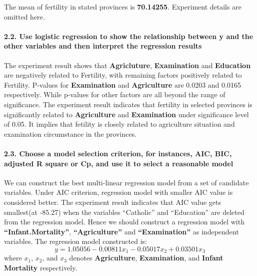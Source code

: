 \documentclass[]{article}
\let\oldparagraph\paragraph
\renewcommand{\paragraph}[1]{\oldparagraph{#1}\mbox{}}
\begin{document}
The mean of fertility in stated provinces is \textbf{70.14255}.
Experiment details are omitted here.

\hypertarget{use-logistic-regression-to-show-the-relationship-between-y-and-the-other-variables-and-then-interpret-the-regression-results}{%
\paragraph{\texorpdfstring{\textbf{2.2. Use logistic regression to show
the relationship between y and the other variables and then interpret
the regression
results}}{2.2. Use logistic regression to show the relationship between y and the other variables and then interpret the regression results}}\label{use-logistic-regression-to-show-the-relationship-between-y-and-the-other-variables-and-then-interpret-the-regression-results}}

The experiment result shows that \textbf{Agricluture},
\textbf{Examination} and \textbf{Education} are negatively related to
Fertility, with remaining factors positively related to Fertility.
P-values for \textbf{Examination} and \textbf{Agriculture} are 0.0203
and 0.0165 respectively. While p-values for other factors are all beyond
the range of significance. The experiment result indicates that
fertility in selected provinces is significantly related to
\textbf{Agriculture} and \textbf{Examination} under significance level
of 0.05. It implies that fetility is closely related to agriculture
situation and examination circumstance in the provinces.

\hypertarget{choose-a-model-selection-criterion-for-instances-aic-bic-adjusted-r-square-or-cp-and-use-it-to-select-a-reasonable-model}{%
\paragraph{\texorpdfstring{\textbf{2.3. Choose a model selection
criterion, for instances, AIC, BIC, adjusted R square or Cp, and use it
to select a reasonable
model}}{2.3. Choose a model selection criterion, for instances, AIC, BIC, adjusted R square or Cp, and use it to select a reasonable model}}\label{choose-a-model-selection-criterion-for-instances-aic-bic-adjusted-r-square-or-cp-and-use-it-to-select-a-reasonable-model}}

We can construct the best multi-linear regression model from a set of
candidate variables. Under AIC criterion, regression model with smaller
AIC value is considered better. The experiment result indicates that AIC
value gets smallest(at -85.27) when the variables ``Catholic'' and
``Education'' are deleted from the regression model. Hence we should
construct a regression model with \textbf{``Infant.Mortality''},
\textbf{``Agriculture''} and \textbf{``Examination''} as independent
variables. The regression model constructed is: \begin{equation}
y = 1.05056-0.00811x_{1}-0.05017x_{2}+0.03501x_{3}
\end{equation} where \(x_{1}\), \(x_{2}\), and \(x_{3}\) denotes
\textbf{Agriculture}, \textbf{Examination}, and \textbf{Infant
Mortality} respectively.
\end{document}
